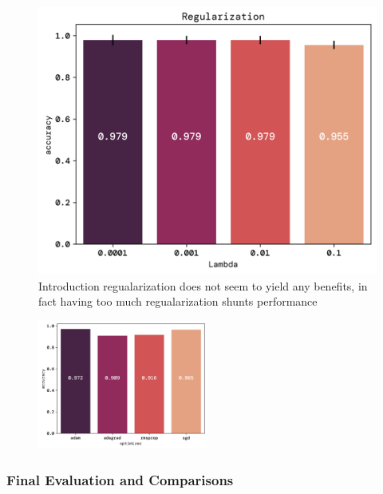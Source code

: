 \documentclass[twoside,11pt]{report}
\begin{document}
\begin{figure}[!ht]
\begin{minipage}[t]{0.49\textwidth}
    \begin{center}
        \includegraphics[width=\textwidth]{../runsAndFigures/accuracy_alpha.png}
    \end{center}
            \caption{Introduction regualarization does not seem to yield any benefits, in fact
    having too much regualarization shunts performance}\label{fig:accuracy_aplha}
\end{minipage}
\end{figure}


\begin{figure}[h]
    \begin{center}
        \includegraphics[width=0.5\textwidth]{../runsAndFigures/optimizer_accuracy.png}
    \end{center}
    \caption{}\label{fig:}
\end{figure}






\subsubsection{Final Evaluation and Comparisons}
\label{sec:comparisons}
\end{document}
